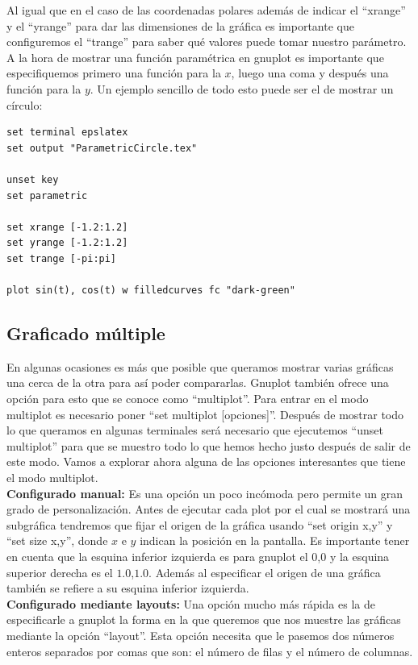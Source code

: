 \documentclass[11pt,a4paper,twoside,pdf]{article}
\numberwithin{equation}{section}
\begin{document}
Al igual que en el caso de las coordenadas polares además de indicar el ``xrange'' y el ``yrange'' para dar las dimensiones de la gráfica es importante que configuremos el ``trange'' para saber qué valores puede tomar nuestro parámetro. A la hora de mostrar una función paramétrica en gnuplot es importante que especifiquemos primero una función para la $x$, luego una coma y después una función para la $y$. Un ejemplo sencillo de todo esto puede ser el de mostrar un círculo:

\begin{lstlisting}[language=Gnuplot]
set terminal epslatex
set output "ParametricCircle.tex"

unset key
set parametric

set xrange [-1.2:1.2]
set yrange [-1.2:1.2]
set trange [-pi:pi]

plot sin(t), cos(t) w filledcurves fc "dark-green"
\end{lstlisting}

\subsection{Graficado múltiple}

En algunas ocasiones es más que posible que queramos mostrar varias gráficas una cerca de la otra para así poder compararlas. Gnuplot también ofrece una opción para esto que se conoce como ``multiplot''. Para entrar en el modo multiplot es necesario poner ``set multiplot [opciones]''. Después de mostrar todo lo que queramos en algunas terminales será necesario que ejecutemos ``unset multiplot'' para que se muestro todo lo que hemos hecho justo después de salir de este modo. Vamos a explorar ahora alguna de las opciones interesantes que tiene el modo multiplot. \\

\textbf{Configurado manual:} Es una opción un poco incómoda pero permite un gran grado de personalización. Antes de ejecutar cada plot por el cual se mostrará una subgráfica tendremos que fijar el origen de la gráfica usando ``set origin x,y'' y ``set size x,y'', donde $x$ e $y$ indican la posición en la pantalla. Es importante tener en cuenta que la esquina inferior izquierda es para gnuplot el $0$,$0$ y la esquina superior derecha es el $1.0$,$1.0$. Además al especificar el origen de una gráfica también se refiere a su esquina inferior izquierda. \\

\textbf{Configurado mediante layouts:} Una opción mucho más rápida es la de especificarle a gnuplot la forma en la que queremos que nos muestre las gráficas mediante la opción ``layout''. Esta opción necesita que le pasemos dos números enteros separados por comas que son: el número de filas y el número de columnas. \\
\end{document}
